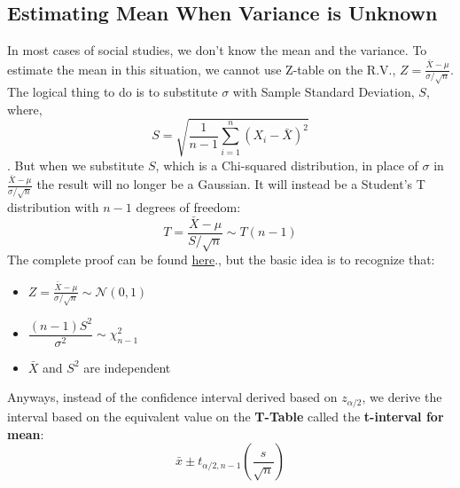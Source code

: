  
\subsection {Estimating Mean When Variance is Unknown}
 In most cases of social studies, we don't know the mean and the variance. To estimate the mean in this situation, we cannot use Z-table on the R.V., \(  Z = \frac{\bar{X}-\mu}{\sigma/\sqrt{n}} \). The logical thing to do is to substitute $\sigma$ with Sample Standard Deviation, $S$, where,
 	\[ S=\sqrt{\dfrac{1}{n-1}\sum\limits_{i=1}^n (X_i-\bar{X})^2} \].
But when we substitute \(S\), which is a Chi-squared distribution, in place of \(\sigma\) in \( \frac{\bar{X}-\mu}{\sigma/\sqrt{n}} \) the result will no longer be a Gaussian. It will instead be a Student's T distribution with $n-1$ degrees of freedom:
	\[ T=\dfrac{\bar{X}-\mu}{S/\sqrt{n}} \sim T(n-1) \]
The complete proof can be found \href{https://online.stat.psu.edu/stat415/lesson/2/2.5}{here}., but the basic idea is to recognize that:
	\begin{itemize}
	\item \(  Z = \frac{\bar{X}-\mu}{\sigma/\sqrt{n}} \sim \mathcal{N}(0,1) \)
	\item \( \dfrac{(n-1)S^2}{\sigma^2}\sim \chi^2_{n-1} \)
	\item \(\bar{X}\) and \(S^2\) are independent
	\end{itemize}

Anyways, instead of the confidence interval derived based on $z_{\alpha/2}$, we derive the interval based on the equivalent value on the \textbf{T-Table} called the \textbf{t-interval for mean}:
	\[ \bar{x}\pm t_{\alpha/2,n-1}\left(\dfrac{s}{\sqrt{n}}\right) \]
	
